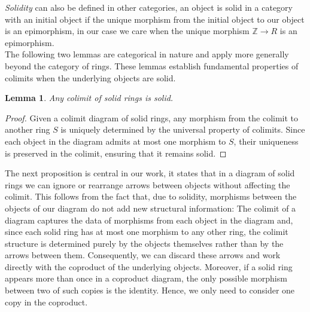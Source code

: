 \documentclass{amsart}
\newtheorem{lemma}[subsection]{Lemma}
\newcommand{\Z}{{\mathbb Z}}
\begin{document}
    \emph{Solidity} can also be defined in other categories, an object is solid in a category with an initial object if the unique morphism from the initial object to our object is an epimorphism, in our case we care when the unique morphism $\Z \to R$ is an epimorphism.\\
    
    The following two lemmas are categorical in nature and apply more generally beyond the category of rings.
    These lemmas establish fundamental properties of colimits when the underlying objects are solid.

    \begin{lemma}
    \label{lmm:co_solid_1}
        Any colimit of solid rings is solid.
    \end{lemma}
    \begin{proof}
        Given a colimit diagram of solid rings, any morphism from the colimit to another ring $S$ is uniquely determined by the universal property of colimits. Since each object in the diagram admits at most one morphism to $S$, their uniqueness is preserved in the colimit, ensuring that it remains solid.
    \end{proof}

    The next proposition is central in our work, it states that in a diagram of solid rings we can ignore or rearrange arrows between objects without affecting the colimit.
    This follows from the fact that, due to solidity, morphisms between the objects of our diagram do not add new structural information:
    The colimit of a diagram captures the data of morphisms from each object in the diagram and,
    since each solid ring has at most one morphism to any other ring, the colimit structure is determined purely by the objects themselves rather than by the arrows between them.
    Consequently, we can discard these arrows and work directly with the coproduct of the underlying objects.
    Moreover, if a solid ring appears more than once in a coproduct diagram, the only possible morphism between two of such copies is the identity.
    Hence, we only need to consider one copy in the coproduct.
\end{document}
